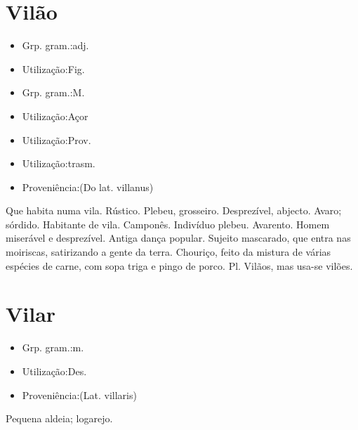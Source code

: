 \documentclass{article}
\begin{document}
\section{Vilão}
\begin{itemize}
\item {Grp. gram.:adj.}
\end{itemize}
\begin{itemize}
\item {Utilização:Fig.}
\end{itemize}
\begin{itemize}
\item {Grp. gram.:M.}
\end{itemize}
\begin{itemize}
\item {Utilização:Açor}
\end{itemize}
\begin{itemize}
\item {Utilização:Prov.}
\end{itemize}
\begin{itemize}
\item {Utilização:trasm.}
\end{itemize}
\begin{itemize}
\item {Proveniência:(Do lat. \textunderscore villanus\textunderscore )}
\end{itemize}
Que habita numa vila.
Rústico.
Plebeu, grosseiro.
Desprezível, abjecto.
Avaro; sórdido.
Habitante de vila.
Camponês.
Indivíduo plebeu.
Avarento.
Homem miserável e desprezível.
Antiga dança popular.
Sujeito mascarado, que entra nas moiriscas, satirizando a gente da terra.
Chouriço, feito da mistura de várias espécies de carne, com sopa triga e pingo de porco.
Pl. \textunderscore Vilãos\textunderscore , mas usa-se \textunderscore vilões\textunderscore .
\section{Vilar}
\begin{itemize}
\item {Grp. gram.:m.}
\end{itemize}
\begin{itemize}
\item {Utilização:Des.}
\end{itemize}
\begin{itemize}
\item {Proveniência:(Lat. \textunderscore villaris\textunderscore )}
\end{itemize}
Pequena aldeia; logarejo.
\end{document}
